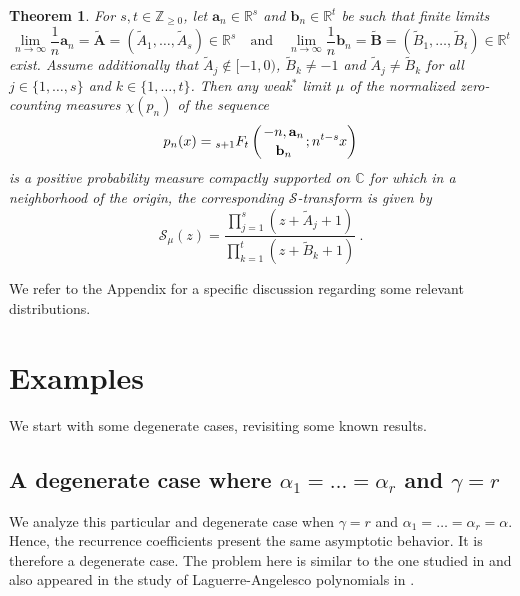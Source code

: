 \documentclass[12pt]{article}
\newcommand{\St}{\mathcal{S}} %
\newtheorem{theorem}{Theorem}[section]
\numberwithin{equation}{section}
\newcommand{\pFq}[5]{{}_{#1}F_{#2} \left( \genfrac{}{}{0pt}{}{#3}{#4}; #5 \right)  }
\begin{document}
\begin{theorem}\label{Thm MF}  For \(s,t\in\mathbb{Z}_{\geq 0}\), let \(\mathbf{a}_n\in\mathbb{R}^s\) and \(\mathbf{b}_n\in\mathbb{R}^t\) be such that finite limits 
\[\lim_{n\to\infty} \frac{1}{n} \mathbf{a}_n = \tilde{\mathbf{A}}=(\tilde{A}_1,\ldots,\tilde{A}_s)\in\mathbb{R}^s
\quad \text{and} \quad 
\lim_{n\to\infty} \frac{1}{n} \mathbf{b}_n = \tilde{\mathbf{B}}=(\tilde{B}_1,\ldots,\tilde{B}_t)\in\mathbb{R}^t\]
exist. Assume additionally that \(\tilde{A}_j\notin[-1,0)\), \(\tilde{B}_k\neq -1\) and \(\tilde{A}_j\neq\tilde{B}_k\) for all \(j\in\{1,\ldots,s\}\) and \(k\in\{1,\ldots,t\}\). Then any weak$^*$ limit \(\mu\) of the normalized zero-counting measures \(\chi(p_n)\) of the sequence 
\[p_n(x) = \pFq{s+1}{t}{-n,\mathbf{a}_n}{\mathbf{b}_n}{n^{t-s}x}\]
is a positive probability measure compactly supported on \(\mathbb{C}\) for which in a neighborhood of the origin,
the corresponding \(\St\)-transform is given by 
\[
    \St_{\mu}(z) = \frac{\prod\limits_{j=1}^s (z + \tilde{A}_j + 1)}{\prod\limits_{k=1}^t (z + \tilde{B}_k + 1)}\ .
\]
\end{theorem}

 
We refer to the Appendix for a specific discussion regarding some relevant distributions. 

\section{Examples}\label{Sec:examples}

We start with some degenerate cases, revisiting some known results. 

\subsection{A degenerate case where \texorpdfstring{$\alpha_1=\ldots =\alpha_r$}{alpha1=...=alphar} and \texorpdfstring{$\gamma =r$}{gamma=r}}

We analyze this particular  and degenerate case when $\gamma=r$ and  $\alpha_1=\ldots = \alpha_r=\alpha$. Hence, the recurrence coefficients present the same asymptotic behavior. It is therefore a degenerate case.  The problem here is  similar to the one studied in \cite[Thm 1.2]{Neuschel} and also appeared in the study of Laguerre-Angelesco polynomials in \cite{LeursVA20}.  
 
\end{document}

